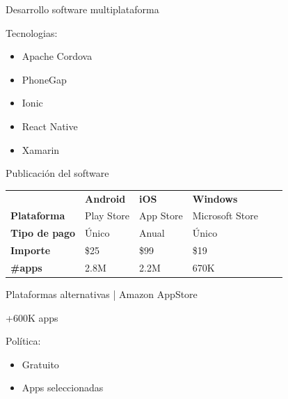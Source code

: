 \begin{frame}{Desarrollo software multiplataforma}

Tecnologias:

\begin{itemize}
    \item Apache Cordova
    \item PhoneGap
    \item Ionic
    \item React Native
    \item Xamarin
\end{itemize}

\end{frame}

\begin{frame}{Publicación del software}

\begin{table}[]
\centering
\begin{tabular}{llllll}
                      & \textbf{Android} & \textbf{iOS} & \textbf{Windows} &  &  \\
\textbf{Plataforma}   & Play Store       & App Store    & Microsoft Store  &  &
\\
\textbf{Tipo de pago} & Único            & Anual        & Único            &  &  \\
\textbf{Importe}      & \$25             & \$99         & \$19             &  &  \\
\textbf{\#apps}   & 2.8M       & 2.2M    & 670K  &  &
\end{tabular}
\end{table}

\end{frame}

\begin{frame}{Plataformas alternativas | Amazon AppStore}

+600K apps

Política:
\begin{itemize}
    \item Gratuito
    \item Apps seleccionadas
\end{itemize}

\end{frame}

